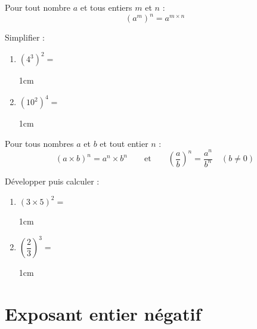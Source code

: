 \documentclass[a4paper]{book}
\begin{document}
    \begin{propriete}
        Pour tout nombre $a$ et tous entiers $m$ et $n$ :
        \[
            \left(a^m\right)^n = a^{m \times n}
        \]
    \end{propriete}

    \begin{exemple}
        Simplifier :
        \begin{enumerate}
            \item $\left(4^3\right)^2 = $
            \begin{ZoneReponse}{1cm}
            \end{ZoneReponse}

            \item $\left(10^2\right)^4 = $
            \begin{ZoneReponse}{1cm}
            \end{ZoneReponse}
        \end{enumerate}
    \end{exemple}

    \begin{propriete}
        Pour tous nombres $a$ et $b$ et tout entier $n$ :
        \[
            (a \times b)^n = a^n \times b^n \qquad \text{et} \qquad \left(\frac{a}{b}\right)^n = \frac{a^n}{b^n} \quad (b \neq 0)
        \]
    \end{propriete}

    \begin{exemple}
        Développer puis calculer :
        \begin{enumerate}
            \item $(3 \times 5)^2 = $
            \begin{ZoneReponse}{1cm}
            \end{ZoneReponse}

            \item $\left(\dfrac{2}{3}\right)^3 = $
            \begin{ZoneReponse}{1cm}
            \end{ZoneReponse}
        \end{enumerate}
    \end{exemple}


\section{Exposant entier négatif}
\end{document}
